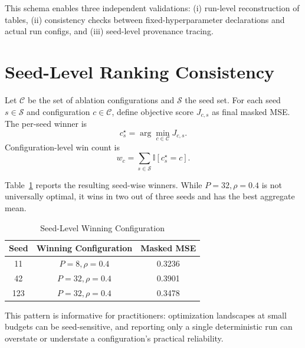 \documentclass[conference]{IEEEtran}
\begin{document}
This schema enables three independent validations: (i) run-level reconstruction of tables, (ii) consistency checks between fixed-hyperparameter declarations and actual run configs, and (iii) seed-level provenance tracing.

\section{Seed-Level Ranking Consistency}
Let $\mathcal{C}$ be the set of ablation configurations and $\mathcal{S}$ the seed set. For each seed $s\in\mathcal{S}$ and configuration $c\in\mathcal{C}$, define objective score $J_{c,s}$ as final masked MSE. The per-seed winner is
\begin{equation}
c_s^{\star}=\arg\min_{c\in\mathcal{C}} J_{c,s}.
\end{equation}
Configuration-level win count is
\begin{equation}
w_c = \sum_{s\in\mathcal{S}} \mathbb{I}[c_s^{\star}=c].
\end{equation}

Table~\ref{tab:seed_winners} reports the resulting seed-wise winners. While $P=32,\rho=0.4$ is not universally optimal, it wins in two out of three seeds and has the best aggregate mean.

\begin{table}[t]
\caption{Seed-Level Winning Configuration}
\label{tab:seed_winners}
\centering
\begin{tabular}{ccc}
\toprule
Seed & Winning Configuration & Masked MSE \\
\midrule
11  & $P=8,\rho=0.4$  & 0.3236 \\
42  & $P=32,\rho=0.4$ & 0.3901 \\
123 & $P=32,\rho=0.4$ & 0.3478 \\
\bottomrule
\end{tabular}
\end{table}

This pattern is informative for practitioners: optimization landscapes at small budgets can be seed-sensitive, and reporting only a single deterministic run can overstate or understate a configuration's practical reliability.
\end{document}
